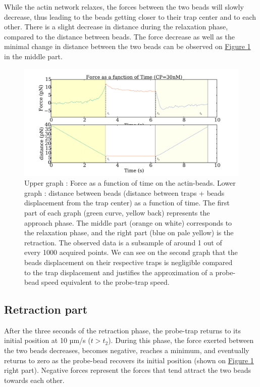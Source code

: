 \documentclass[A4paperpaper,11pt,english]{sphinxmanual}
\begin{document}
While the actin network relaxes, the forces between the two beads will slowly
decrease, thus leading to the beads getting closer to their trap center and
to each other. There is a slight decrease in distance during the relaxation phase, compared to the distance between beads. The force decrease as well as
the minimal change in distance between the two beads can be observed on \hyperref[parts/part3:figindent-time]{Figure  \ref*{parts/part3:figindent-time}}
in the middle part.
\begin{figure}[htbp]
\centering
\capstart

\includegraphics[width=0.700\linewidth]{force_time.pdf}
\caption{Upper graph : Force as a function of time on the actin-beads.  Lower graph
: distance between beads (distance between traps + beads
displacement from the trap center) as a function of time. The first part of each graph
(green curve, yellow back) represents the approach phase. The middle part
(orange on white) corresponds to the relaxation phase, and the right part (blue on pale
yellow) is the retraction. The observed data is a subsample of around 1 out of every
1000 acquired points. We can see on the second graph that the beads
displacement on their respective traps is negligible compared to the
trap displacement and justifies the approximation of a probe-bead
speed equivalent to the probe-trap speed.}\label{parts/part3:figindent-time}\end{figure}


\subsection{Retraction part}
\label{parts/part3:retraction-part}
After the three seconds of the retraction phase, the probe-trap returns to
its  initial position at 10 µm/s (\(t > t_2\)). During this phase, the force
exerted between the two beads decreases, becomes negative, reaches a minimum, and
eventually returns to zero as the probe-bead recovers its initial
position (shown on \hyperref[parts/part3:figindent-time]{Figure  \ref*{parts/part3:figindent-time}} right part). Negative forces
represent the forces that tend attract the two beads towards each other.
\end{document}
